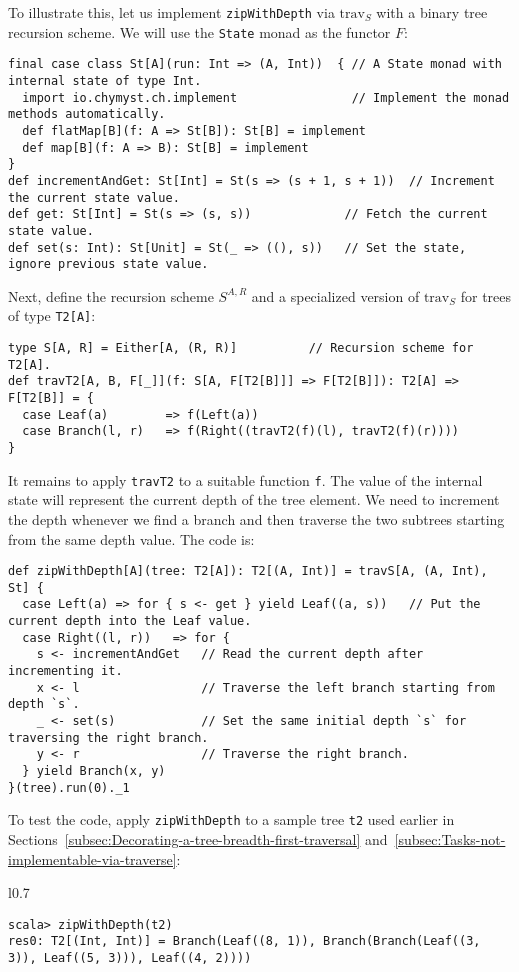 To illustrate this, let us implement \lstinline!zipWithDepth! via
$\text{trav}_{S}$ with a binary tree recursion scheme. We will use
the \lstinline!State! monad as the functor $F$:
\begin{lstlisting}
final case class St[A](run: Int => (A, Int))  { // A State monad with internal state of type Int.
  import io.chymyst.ch.implement                // Implement the monad methods automatically.
  def flatMap[B](f: A => St[B]): St[B] = implement
  def map[B](f: A => B): St[B] = implement
}
def incrementAndGet: St[Int] = St(s => (s + 1, s + 1))  // Increment the current state value.
def get: St[Int] = St(s => (s, s))             // Fetch the current state value.
def set(s: Int): St[Unit] = St(_ => ((), s))   // Set the state, ignore previous state value.
\end{lstlisting}
Next, define the recursion scheme $S^{A,R}$ and a specialized version
of $\text{trav}_{S}$ for trees of type \lstinline!T2[A]!:
\begin{lstlisting}
type S[A, R] = Either[A, (R, R)]          // Recursion scheme for T2[A].
def travT2[A, B, F[_]](f: S[A, F[T2[B]]] => F[T2[B]]): T2[A] => F[T2[B]] = {
  case Leaf(a)        => f(Left(a))
  case Branch(l, r)   => f(Right((travT2(f)(l), travT2(f)(r))))
}
\end{lstlisting}
It remains to apply \lstinline!travT2! to a suitable function \lstinline!f!.
The value of the internal state will represent the current depth of
the tree element. We need to increment the depth whenever we find
a branch and then traverse the two subtrees starting from the same
depth value. The code is:
\begin{lstlisting}
def zipWithDepth[A](tree: T2[A]): T2[(A, Int)] = travS[A, (A, Int), St] {
  case Left(a) => for { s <- get } yield Leaf((a, s))   // Put the current depth into the Leaf value.
  case Right((l, r))   => for {
    s <- incrementAndGet   // Read the current depth after incrementing it.
    x <- l                 // Traverse the left branch starting from depth `s`.
    _ <- set(s)            // Set the same initial depth `s` for traversing the right branch.       
    y <- r                 // Traverse the right branch.
  } yield Branch(x, y)
}(tree).run(0)._1
\end{lstlisting}
To test the code, apply \lstinline!zipWithDepth! to a sample tree
\lstinline!t2! used earlier in Sections~\ref{subsec:Decorating-a-tree-breadth-first-traversal}
and~\ref{subsec:Tasks-not-implementable-via-traverse}:

\begin{wrapfigure}{l}{0.7\columnwidth}%
\vspace{-0.75\baselineskip}
\begin{lstlisting}
scala> zipWithDepth(t2)
res0: T2[(Int, Int)] = Branch(Leaf((8, 1)), Branch(Branch(Leaf((3, 3)), Leaf((5, 3))), Leaf((4, 2))))
\end{lstlisting}

\vspace{-0.5\baselineskip}
\end{wrapfigure}%

